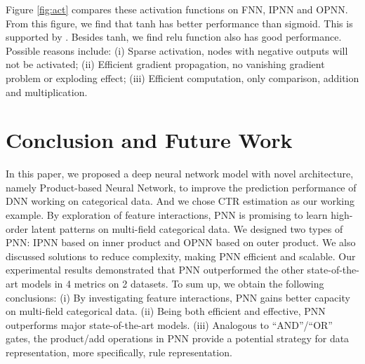 \documentclass[conference]{IEEEtran}
\newcommand{\rocky}[1]{{\bf \color{pink} [[Rocky says ``#1'']]}}
\begin{document}
Figure \ref{fig:act} compares these activation functions on FNN, IPNN and OPNN. From this figure, we find that tanh has better performance than sigmoid. This is supported by \cite{zhang2016deep}.
Besides tanh, we find relu function also has good performance. Possible reasons include: (i) Sparse activation, nodes with negative outputs will not be activated; (ii) Efficient gradient propagation, no vanishing gradient problem or exploding effect; (iii) Efficient computation, only comparison, addition and multiplication.

\section{Conclusion and Future Work}\label{sec:conclusion}
In this paper, we proposed a deep neural network model with novel architecture, namely Product-based Neural Network, to improve the prediction performance of DNN working on categorical data. And we chose CTR estimation as our working example. By exploration of feature interactions, PNN
is promising to learn high-order latent patterns on multi-field categorical data.
We designed two types of PNN: IPNN based on inner product and OPNN based on outer product. We also discussed solutions to reduce complexity, making PNN efficient and scalable. Our experimental results demonstrated that PNN outperformed the other state-of-the-art models in 4 metrics on 2 datasets. To sum up, we obtain the following conclusions: (i)
By investigating feature interactions, PNN gains better capacity on multi-field categorical data. (ii) Being both efficient and effective, PNN outperforms major state-of-the-art models. (iii)
Analogous to ``AND''/``OR'' gates, the product/add operations in PNN
provide a potential strategy for data representation, more specifically, rule representation.
\end{document}

